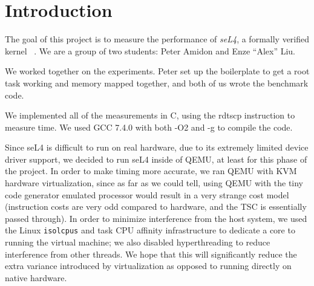 \section{Introduction}
The goal of this project is to measure the performance of \textit{seL4},
a formally verified kernel ~\cite{klein2009sel4}. 
We are a group of two students: Peter Amidon and Enze ``Alex'' Liu. 

We worked together on the experiments. Peter set up the boilerplate to
get a root task working and memory mapped together, and both of us wrote the
benchmark code.

We implemented all of the measurements in C, using the rdtscp
instruction to measure time.  We used GCC 7.4.0 with both -O2 and -g
to compile the code.

Since seL4 is difficult to run on real hardware, due to its extremely
limited device driver support, we decided to run seL4 inside of QEMU,
at least for this phase of the project. In order to make timing more
accurate, we ran QEMU with KVM hardware virtualization, since as far
as we could tell, using QEMU with the tiny code generator emulated
processor would result in a very strange cost model (instruction costs
are very odd compared to hardware, and the TSC is essentially passed
through). In order to minimize interference from the host system, we
used the Linux \verb|isolcpus| and task CPU affinity infrastructure to
dedicate a core to running the virtual machine; we also disabled
hyperthreading to reduce interference from other threads. We hope that
this will significantly reduce the extra variance introduced by
virtualization as opposed to running directly on native hardware.
